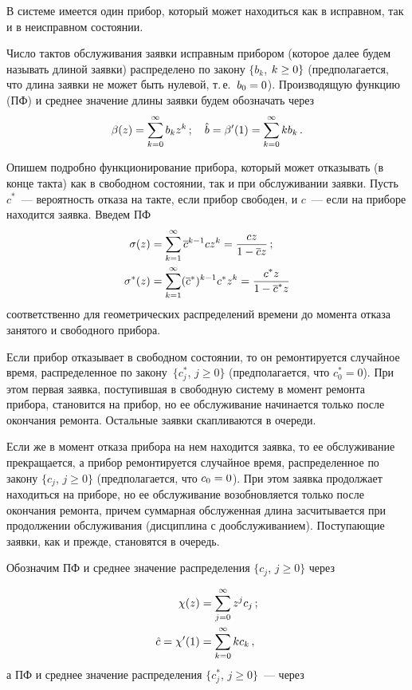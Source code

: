 \begin{multicols}{2}
В системе имеется один прибор, который может находиться как в
исправном, так и в неисправном состоянии.

Число тактов обслуживания заявки исправным прибором (которое далее
будем называть длиной заявки) распределено по закону $\{b_k$, $k\hm \ge 0
\}$ (предполагается, что длина заявки не может быть нулевой, т.\,е.\
$b_0\hm=0$). Производящую функцию (ПФ) и среднее значение длины заявки будем
обозначать через
$$
\beta (z) =\sum\limits_{k=0}^{\infty} b_k z^k\,;\quad
\hat b=\beta'(1)=\sum\limits_{k=0}^{\infty} k b_k\,.
$$

Опишем подробно функционирование прибора,
который может отказывать (в конце такта) как в свободном со\-сто\-янии,
так и при обслуживании заявки.
Пусть $c^*$~--- ве\-ро\-ят\-ность отказа на такте, если прибор
свободен, и $c$~--- если на приборе находится заявка.
Введем ПФ
\begin{align*}
\sigma (z) &= \sum\limits_{k=1}^{\infty} \overline c^{k-1} c z^k
= \displaystyle\frac{\displaystyle cz\mathstrut}{\displaystyle 1-\overline c z\mathstrut}\,;
\\
\sigma^* (z) &= \sum\limits_{k=1}^{\infty}  (\overline c^*)^{k-1} c^* z^k
= \displaystyle\frac{\displaystyle c^*z\mathstrut}{\displaystyle 1-\overline c^* z\mathstrut}
\end{align*}
соответственно для
геометрических распределений времени
до момента отказа занятого и свободного прибора.

Если прибор отказывает в свободном состоянии, то он ремонтируется
случайное время, распределенное по закону~$\{c^*_j$, $j\ge 0\}$
(предполагается, что $c^*_0=0$).
При этом первая заявка, поступившая в свободную сис\-те\-му в момент
ремонта прибора, становится на прибор, но ее обслуживание
начинается только после окончания ремонта.
Остальные заявки скапливаются в очереди.

Если же в момент отказа прибора на нем находится заявка, то
ее обслуживание прекращается, а прибор ремонтируется случайное
время, распределенное по закону $\{c_j$, $j\ge 0\}$
(предполагается, что $c_0\hm=0$).
При этом заявка продолжает находиться на приборе, но ее
обслуживание возобновляется только после окончания ремонта,
причем суммарная обслуженная длина засчитывается при продолжении
обслуживания (дисциплина с дообслуживанием).
Поступающие заявки, как и прежде, становятся в очередь.

Обозначим ПФ и среднее значение распределения $\{c_j$, $j\ge 0\}$ через

\noindent
\begin{align*}
\chi(z)&=\sum\limits_{j=0}^{\infty} z^j c_j\,;\\
\hat c=\chi'(1)&=\sum\limits_{k=0}^{\infty} k c_k\,,
\end{align*}
а ПФ и среднее значение распределения $\{c^*_j$, $j\ge 0\}$~--- через


\end{multicols}
